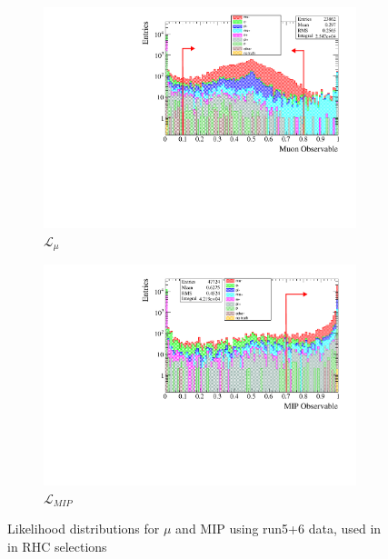 \begin{figure}[h]
	\begin{subfigure}[t]{0.49\textwidth}
		\includegraphics[width=\textwidth]{figures/numu/Cuts/numu_in_numubar/MuonLikelihood_prod6B_NuMuCont_FGD1Only}
		\caption{$\mathcal{L}_\mu$}
	\end{subfigure}
	\begin{subfigure}[t]{0.49\textwidth}
		\includegraphics[width=\textwidth]{figures/numu/Cuts/numu_in_numubar/MipLikelihood_LogScale}
		\caption{$\mathcal{L}_{MIP}$}
	\end{subfigure}
	\caption{Likelihood distributions for $\mu$ and MIP using run5+6 \numubar data, used in \numu in RHC selections}
	\label{fig:nu_numubar_likelihood}
\end{figure}

